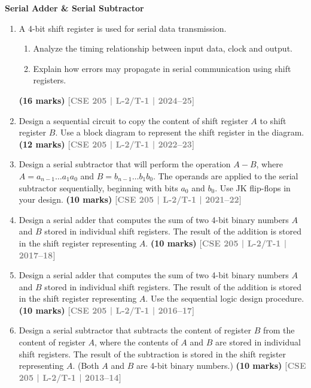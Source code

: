 \documentclass[12pt,a3paper]{article}
\newcommand{\yr}[1]{\hfill\textcolor{gray}{\small\textbf{[#1]}}}
\newcommand{\mk}[1]{\textcolor{orange!70!black}{\small\textbf{(#1 marks)}}}
\newcommand{\subtopic}[2]{%
  \vspace{10pt}
  \noindent\begin{tcolorbox}[colback=#1!8,colframe=#1,boxrule=0.6pt,arc=4pt,
    left=6pt,right=6pt,top=4pt,bottom=4pt]
    \small\bfseries\textcolor{#1}{#2}
  \end{tcolorbox}
  \vspace{2pt}
}
\begin{document}
\subtopic{cG}{Serial Adder \& Serial Subtractor}
\label{sub:s7-serial}

\begin{enumerate}

\item A 4-bit shift register is used for serial data transmission.
\begin{enumerate}
  \item Analyze the timing relationship between input data, clock and output.
  \item Explain how errors may propagate in serial communication using shift registers.
\end{enumerate}
\mk{16} \yr{CSE 205 | L-2/T-1 | 2024--25}

\item Design a sequential circuit to copy the content of shift register $A$ to shift register $B$. Use a block diagram to represent the shift register in the diagram.
\mk{12} \yr{CSE 205 | L-2/T-1 | 2022--23}

\item Design a serial subtractor that will perform the operation $A - B$, where $A = a_{n-1}\ldots a_1 a_0$ and $B = b_{n-1}\ldots b_1 b_0$. The operands are applied to the serial subtractor sequentially, beginning with bits $a_0$ and $b_0$. Use JK flip-flops in your design.
\mk{10} \yr{CSE 205 | L-2/T-1 | 2021--22}

\item Design a serial adder that computes the sum of two 4-bit binary numbers $A$ and $B$ stored in individual shift registers. The result of the addition is stored in the shift register representing $A$.
\mk{10} \yr{CSE 205 | L-2/T-1 | 2017--18}

\item Design a serial adder that computes the sum of two 4-bit binary numbers $A$ and $B$ stored in individual shift registers. The result of the addition is stored in the shift register representing $A$. Use the sequential logic design procedure.
\mk{10} \yr{CSE 205 | L-2/T-1 | 2016--17}

\item Design a serial subtractor that subtracts the content of register $B$ from the content of register $A$, where the contents of $A$ and $B$ are stored in individual shift registers. The result of the subtraction is stored in the shift register representing $A$. (Both $A$ and $B$ are 4-bit binary numbers.)
\mk{10} \yr{CSE 205 | L-2/T-1 | 2013--14}



\end{enumerate}
\end{document}
